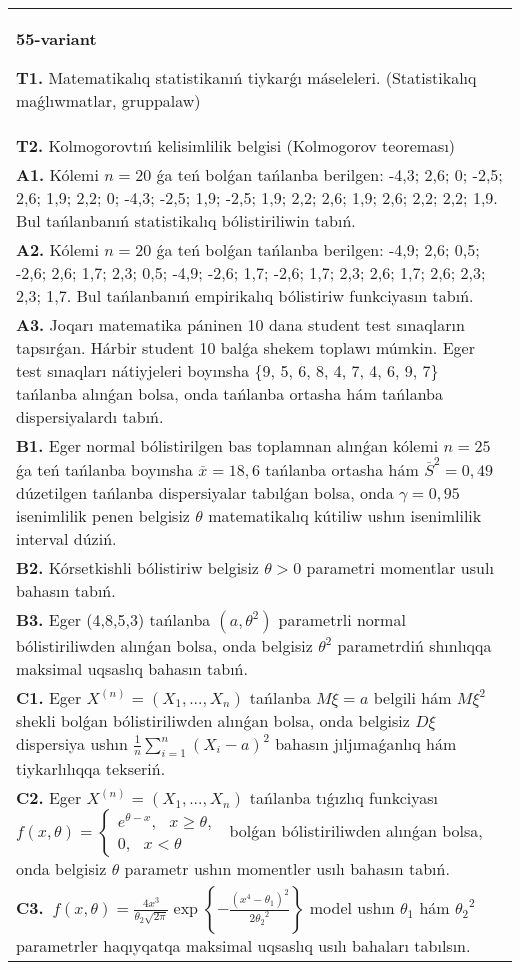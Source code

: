 \documentclass{article}
\begin{document}
\begin{tabular}{m{17cm}}
\textbf{55-variant}
\newline

\textbf{T1.} Matematikalıq statistikanıń tiykarǵı máseleleri. (Statistikalıq maǵlıwmatlar, gruppalaw)
 \\
\textbf{T2.} 
Kolmogorovtıń kelisimlilik belgisi (Kolmogorov teoreması)
 \\
\textbf{A1.} 
Kólemi \(n = 20\) ǵa teń bolǵan tańlanba berilgen: -4,3; 2,6; 0; -2,5; 2,6; 1,9; 2,2; 0; -4,3; -2,5; 1,9; -2,5; 1,9; 2,2; 2,6; 1,9; 2,6; 2,2; 2,2; 1,9. Bul tańlanbanıń statistikalıq bólistiriliwin tabıń.
 \\
\textbf{A2.} 
Kólemi \(n = 20\) ǵa teń bolǵan tańlanba berilgen: -4,9; 2,6; 0,5; -2,6; 2,6; 1,7; 2,3; 0,5; -4,9; -2,6; 1,7; -2,6; 1,7; 2,3; 2,6; 1,7; 2,6; 2,3; 2,3; 1,7. Bul tańlanbanıń empirikalıq bólistiriw funkciyasın tabıń.
 \\
\textbf{A3.} 
Joqarı matematika páninen 10 dana student test sınaqların tapsırǵan. Hárbir student 10 balǵa shekem toplawı múmkin. Eger test sınaqları nátiyjeleri boyınsha \{9, 5, 6, 8, 4, 7, 4, 6, 9, 7\} tańlanba alınǵan bolsa, onda tańlanba ortasha hám tańlanba dispersiyalardı tabıń.
 \\
\textbf{B1.} 
Eger normal bólistirilgen bas toplamnan alınǵan kólemi \(n = 25\) ǵa teń tańlanba boyınsha \(\overline{x} = 18,6\) tańlanba ortasha hám \({\overline{S}}^{2} = 0,49\) dúzetilgen tańlanba dispersiyalar tabılǵan bolsa, onda \(\gamma = 0,95\) isenimlilik penen belgisiz \(\theta\) matematikalıq kútiliw ushın isenimlilik interval dúziń.
 \\
\textbf{B2.} 
Kórsetkishli bólistiriw belgisiz \(\theta > 0\) parametri momentlar usulı bahasın tabıń.
 \\
\textbf{B3.} 
Eger (4,8,5,3) tańlanba \(\left( a,\theta^{2} \right)\) parametrli normal bólistiriliwden alınǵan bolsa, onda belgisiz \(\theta^{2}\) parametrdiń shınlıqqa maksimal uqsaslıq bahasın tabıń.
 \\
\textbf{C1.} 
Eger \(X^{(n)} = \left( X_{1},...,X_{n} \right)\) tańlanba \(M\xi = a\) belgili hám \(M\xi^{2}\) shekli bolǵan bólistiriliwden alınǵan bolsa, onda belgisiz \(D\xi\) dispersiya ushın \(\frac{1}{n}\sum_{i = 1}^{n}\left( X_{i} - a \right)^{2}\) bahasın jıljımaǵanlıq hám tiykarlılıqqa tekseriń.
 \\
\textbf{C2.} 
Eger \(X^{(n)} = \left( X_{1},...,X_{n} \right)\) tańlanba tıǵızlıq funkciyası
$
{f(x,\theta) = \left\{ \begin{array}{r}
e^{\theta - x},\ \ \ x \geq \theta, \\
0,\ \ \ x < \theta
\end{array} \right.\ }$
bolǵan bólistiriliwden alınǵan bolsa, onda belgisiz \(\theta\) parametr ushın momentler usılı bahasın tabıń.
 \\
\textbf{C3.} 
\(\ f(x,\theta) = \frac{4x^{3}}{\theta_{2}\sqrt{2\pi}}\exp\left\{ - \frac{\left( x^{4} - \theta_{1} \right)^{2}}{2{\theta_{2}}^{2}} \right\}\) model ushın \(\theta_{1}\) hám \({\theta_{2}}^{2}\) parametrler haqıyqatqa maksimal uqsaslıq usılı bahaları tabılsın.
 \\

\end{tabular}
\end{document}
